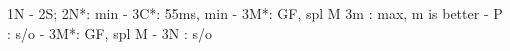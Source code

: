1N - 2S;
2N*: min
   - 3C*: 55ms, min
   - 3M*: GF, spl M
3m : max, m is better
   - P  : s/o
   - 3M*: GF, spl M
   - 3N : s/o